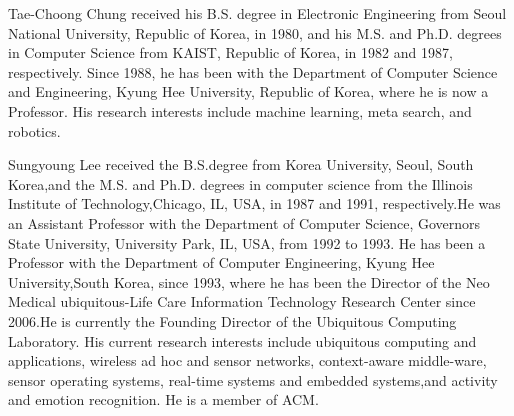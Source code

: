 \documentclass{ieeeaccess}
\begin{document}
\begin{IEEEbiography}{Tae-Choong Chung}  received his B.S. degree in Electronic Engineering from Seoul National University, Republic of Korea, in 1980, and his M.S. and Ph.D. degrees in Computer Science from KAIST, Republic of Korea, in 1982 and 1987, respectively. Since 1988, he has been with the Department of Computer Science and Engineering, Kyung Hee University, Republic of Korea, where he is now a Professor. His research interests include machine learning, meta search, and robotics.
\end{IEEEbiography}
\begin{IEEEbiography}{Sungyoung Lee} received the B.S.degree from Korea University, Seoul, South Korea,and the M.S. and Ph.D. degrees in computer science from the Illinois Institute of Technology,Chicago, IL, USA, in 1987 and 1991, respectively.He was an Assistant Professor with the Department of Computer Science, Governors State University, University Park, IL, USA, from 1992 to 1993. He has been a Professor with the Department of Computer Engineering, Kyung Hee University,South Korea, since 1993, where he has been the Director of the Neo Medical ubiquitous-Life Care Information Technology Research Center since 2006.He is currently the Founding Director of the Ubiquitous Computing Laboratory. His current research interests include ubiquitous computing and applications, wireless ad hoc and sensor networks, context-aware middle-ware, sensor operating systems, real-time systems and embedded systems,and activity and emotion recognition. He is a member of ACM.
\end{IEEEbiography}

\EOD
\end{document}
